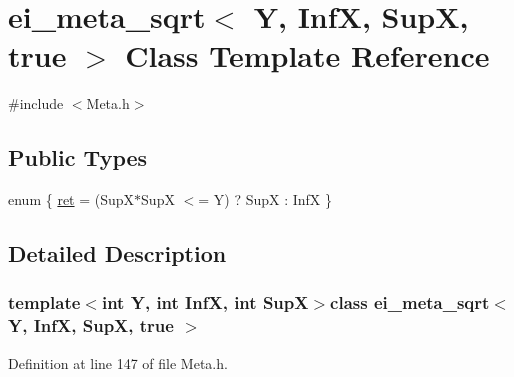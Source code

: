 \hypertarget{classei__meta__sqrt_3_01_y_00_01_inf_x_00_01_sup_x_00_01true_01_4}{\section{ei\-\_\-meta\-\_\-sqrt$<$ Y, Inf\-X, Sup\-X, true $>$ Class Template Reference}
\label{classei__meta__sqrt_3_01_y_00_01_inf_x_00_01_sup_x_00_01true_01_4}
}


{\ttfamily \#include $<$Meta.\-h$>$}

\subsection*{Public Types}
\begin{DoxyCompactItemize}
\item 
enum \{ \hyperlink{classei__meta__sqrt_3_01_y_00_01_inf_x_00_01_sup_x_00_01true_01_4_a710aa0ac6ad81bd736e56f37165c4cbaa90487774a782231f8aa0bf01810b5507}{ret} = (Sup\-X$\ast$\-Sup\-X $<$= Y) ? Sup\-X \-: Inf\-X
 \}
\end{DoxyCompactItemize}


\subsection{Detailed Description}
\subsubsection*{template$<$int Y, int Inf\-X, int Sup\-X$>$class ei\-\_\-meta\-\_\-sqrt$<$ Y, Inf\-X, Sup\-X, true $>$}



Definition at line 147 of file Meta.\-h.



